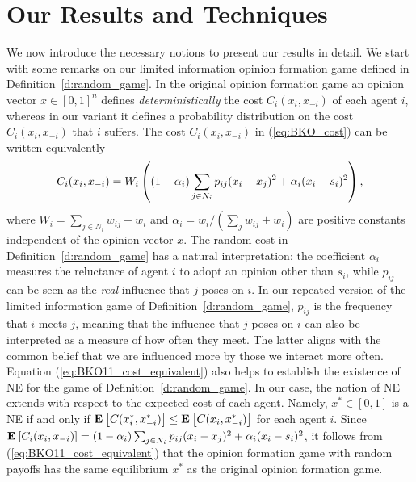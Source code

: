 \section{Our Results and Techniques}
We now introduce the necessary notions to present our results in detail.
We start with some remarks on our limited information opinion formation game
defined in Definition~\ref{d:random_game}.
In the original opinion formation game an opinion vector $x\in [0,1]^n$ defines
\emph{deterministically} the cost $C_i(x_i,x_{-i})$ of each agent $i$,
whereas in our variant it defines a probability distribution on the cost
$C_i(x_i,x_{-i})$ that $i$ suffers.
The cost $C_i(x_i,x_{-i})$ in (\ref{eq:BKO_cost}) can be written equivalently
\begin{equation}\label{eq:BKO11_cost_equivalent}
  C_i(x_i,x_{-i}) =
  W_i\left( (1-\alpha_i)\sum_{j \in N_i} p_{ij}(x_i-x_j)^2
  + \alpha_i(x_i-s_i)^2\right),
\end{equation}
where $W_i=\sum_{j\in N_i}w_{ij} + w_i$ and
$\alpha_i = w_i/(\sum_{j} w_{ij} + w_i)$ are positive constants independent of
the opinion vector $x$.
The random cost in Definition~\ref{d:random_game} has a natural
interpretation: the coefficient $\alpha_i$ measures the reluctance of agent
$i$ to adopt an opinion other than $s_i$, while $p_{ij}$ can be seen as the
\emph{real} influence that $j$ poses on $i$.
In our repeated version of the limited information game of Definition~\ref{d:random_game},
$p_{ij}$ is the frequency that $i$ meets $j$, meaning that the influence that
$j$ poses on $i$ can also be interpreted as a measure
of how often they meet. The latter aligns with the common belief
that we are influenced more by those we interact more often.
Equation (\ref{eq:BKO11_cost_equivalent}) also helps to establish the existence
of NE for the game of Definition~\ref{d:random_game}.
In our case, the notion of NE extends with respect to the expected cost of each
agent. Namely, $x^* \in [0,1]$ is a NE if and only if
$\Exp{C(x_i^*, x_{-i}^*)} \leq \Exp{C(x_i, x_{-i}^*)}$
for each agent $i$.
Since
$\bm{\mathrm{E}}_{} \left[ C_i(x_i,x_{-i}) \right]=
(1-\alpha_i) \sum_{j \in N_i}p_{ij}(x_i-x_j)^2 + \alpha_i(x_i-s_i)^2 $,
it follows from (\ref{eq:BKO11_cost_equivalent}) that the
opinion formation game with random payoffs has the same equilibrium $x^*$ as
the original opinion formation game.

